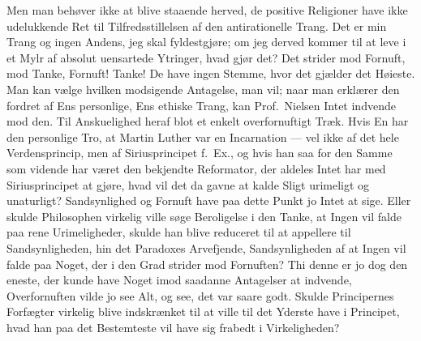 Men man behøver ikke at blive staaende herved, de positive Religioner have
ikke udelukkende Ret til Tilfredsstillelsen af den antirationelle Trang. Det
er min Trang og ingen Andens, jeg skal fyldestgjøre; om jeg derved kommer til
at leve i et Mylr af absolut uensartede Ytringer, hvad gjør det? Det strider
mod Fornuft, mod Tanke, Fornuft! Tanke! De have ingen Stemme, hvor det
gjælder det Høieste. Man kan vælge hvilken modsigende Antagelse, man vil;
naar man erklærer den fordret af Ens personlige, Ens ethiske Trang, kan Prof.\
Nielsen Intet indvende mod den. Til Anskuelighed heraf blot et enkelt
overfornuftigt Træk. Hvis En har den personlige Tro, at Martin Luther var en
Incarnation --- vel ikke af det
hele Verdensprincip, men af Siriusprincipet f.\ Ex., og hvis han saa
for den Samme som vidende har været den bekjendte Reformator, der aldeles
Intet har med Siriusprincipet at gjøre, hvad vil det da gavne at kalde Sligt
urimeligt og unaturligt? Sandsynlighed og Fornuft have paa dette Punkt jo
Intet at sige. Eller skulde Philosophen virkelig ville søge Beroligelse i den
Tanke, at Ingen vil falde paa rene Urimeligheder, skulde han blive reduceret
til at appellere til Sandsynligheden, hin det Paradoxes Arvefjende,
Sandsynligheden af at Ingen vil falde paa Noget, der i den Grad strider mod
Fornuften? Thi denne er jo dog den eneste, der kunde have Noget imod saadanne
Antagelser at indvende, Overfornuften vilde jo see Alt, og see, det var saare
godt. Skulde Principernes Forfægter virkelig blive indskrænket til at ville
til det Yderste have i Principet, hvad han paa det Bestemteste vil have sig
frabedt i Virkeligheden?

